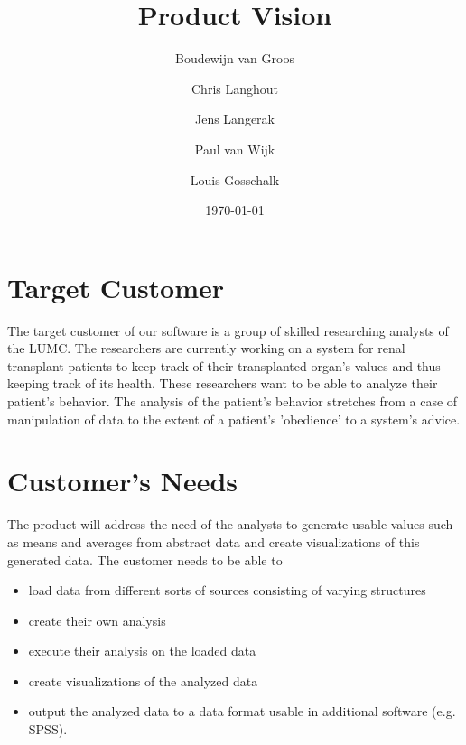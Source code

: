 \documentclass[a4paper]{article}
\title{Product Vision}
\author[1]{Boudewijn van Groos}
\author[2]{Chris Langhout}
\author[3]{Jens Langerak}
\author[4]{Paul van Wijk}
\author[5]{Louis Gosschalk}
\affil[1]{bvangroos \\
4229843}
\affil[2]{clanghout \\
4281705}
\affil[3]{jlangerak \\
4317327}
\affil[4]{pvanwijk \\
4285034}
\affil[5]{lgosschalk \\
4214528}
\date{\today}
\begin{document}
\maketitle
\tableofcontents
\newpage

\section{Target Customer}
The target customer of our software is a group of skilled researching analysts of the LUMC. The researchers are currently working on a system for renal transplant patients to keep track of their transplanted organ's values and thus keeping track of its health. These researchers want to be able to analyze their patient's behavior. The analysis of the patient's behavior stretches from a case of manipulation of data to the extent of a patient's 'obedience' to a system's advice.

\section{Customer's Needs}
The product will address the need of the analysts to generate usable values such as means and averages from abstract data and create visualizations of this generated data. The customer needs to be able to 
\begin{itemize}
\item load data from different sorts of sources consisting of varying structures 
\item create their own analysis 
\item execute their analysis on the loaded data
\item create visualizations of the analyzed data
\item output the analyzed data to a data format usable in additional software (e.g. SPSS).
\end{itemize}
\end{document}
